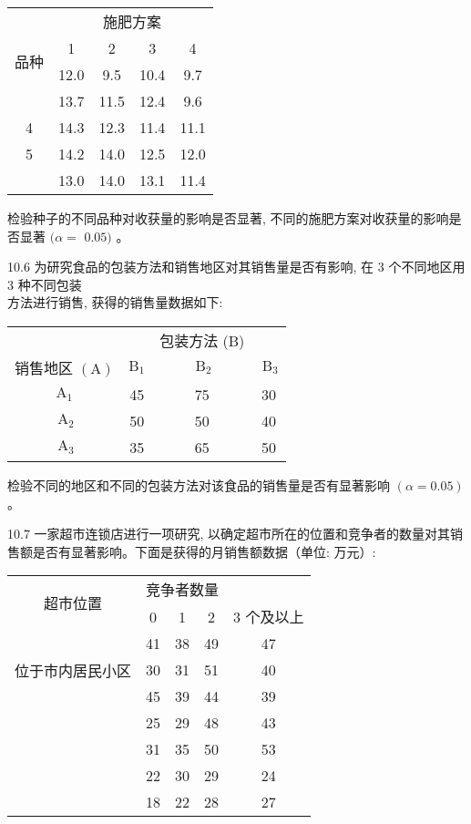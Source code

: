 \documentclass[10pt]{article}
\begin{document}
\begin{CJK*}{UTF8}{bsmi}
\begin{center}
\begin{tabular}{ccccc}
\hline
\multirow{4}{c}{品种} & \multicolumn{4}{c}{施肥方案} \\
\cline { 2 - 5 }
 & 1 & 2 & 3 & 4 \\
\hline
 & 12.0 & 9.5 & 10.4 & 9.7 \\
 & 13.7 & 11.5 & 12.4 & 9.6 \\
4 & 14.3 & 12.3 & 11.4 & 11.1 \\
5 & 14.2 & 14.0 & 12.5 & 12.0 \\
 & 13.0 & 14.0 & 13.1 & 11.4 \\
\hline
\end{tabular}
\end{center}

检验种子的不同品种对收获量的影响是否显著, 不同的施肥方案对收获量的影响是否显著 $(\alpha=$ $0.05)$ 。

10.6 为研究食品的包装方法和销售地区对其销售量是否有影响, 在 3 个不同地区用 3 种不同包装\\
方法进行销售, 获得的销售量数据如下:

\begin{center}
\begin{tabular}{cccc}
\hline
 &  & 包装方法 (B) &  \\
\cline { 2 - 4 }
销售地区 $(\mathrm{A})$ & $\mathrm{B}_{1}$ & $\mathrm{~B}_{2}$ & $\mathrm{~B}_{3}$ \\
\hline
$\mathrm{A}_{1}$ & 45 & 75 & 30 \\
$\mathrm{~A}_{2}$ & 50 & 50 & 40 \\
$\mathrm{~A}_{3}$ & 35 & 65 & 50 \\
\hline
\end{tabular}
\end{center}

检验不同的地区和不同的包装方法对该食品的销售量是否有显著影响 $(\alpha=0.05)$ 。

10.7 一家超市连锁店进行一项研究, 以确定超市所在的位置和竞争者的数量对其销售额是否有显著影响。下面是获得的月销售额数据（单位: 万元）:

\begin{center}
\begin{tabular}{ccccc}
\hline
\multirow{2}{*}{超市位置} & \multicolumn{3}{c}{竞争者数量} &  \\
\cline { 2 - 5 }
 & 0 & 1 & 2 & 3 个及以上 \\
\hline
\multirow{3}{*}{位于市内居民小区} & 41 & 38 & 49 & 47 \\
 & 30 & 31 & 51 & 40 \\
 & 45 & 39 & 44 & 39 \\
 & 25 & 29 & 48 & 43 \\
 & 31 & 35 & 50 & 53 \\
\hline
 & 22 & 30 & 29 & 24 \\
 & 18 & 22 & 28 & 27 \\
\hline
\end{tabular}
\end{center}


\end{CJK*}
\end{document}
